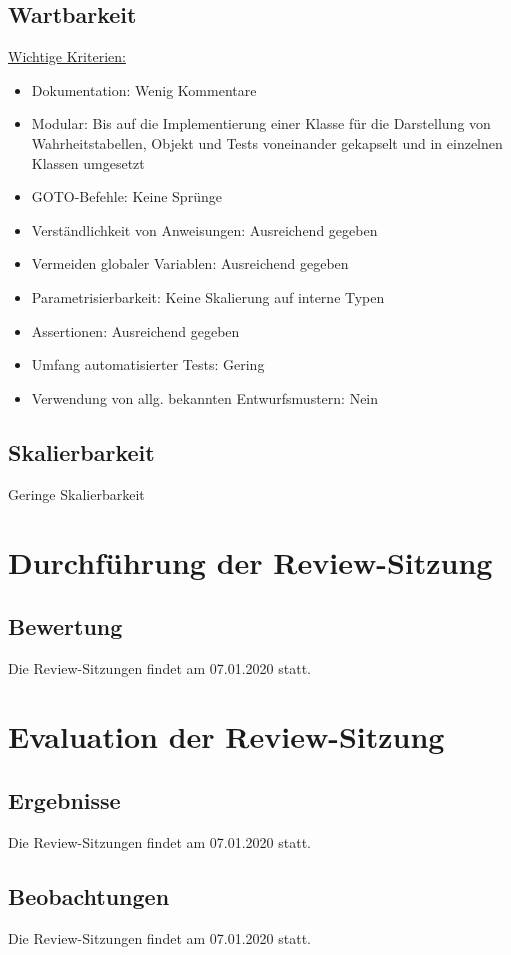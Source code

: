 \documentclass[11pt]{article}
\begin{document}
    \subsection{Wartbarkeit}
    \underline{Wichtige Kriterien:}
    \begin{itemize}
        \item Dokumentation: Wenig Kommentare
        \item Modular: Bis auf die Implementierung einer Klasse f\"ur die Darstellung von Wahrheitstabellen, Objekt und Tests voneinander gekapselt und in einzelnen Klassen umgesetzt
        \item GOTO-Befehle: Keine Spr\"unge
        \item Verst\"andlichkeit von Anweisungen: Ausreichend gegeben
        \item Vermeiden globaler Variablen: Ausreichend gegeben
        \item Parametrisierbarkeit: Keine Skalierung auf interne Typen
        \item Assertionen: Ausreichend gegeben
        \item Umfang automatisierter Tests: Gering
        \item Verwendung von allg. bekannten Entwurfsmustern: Nein
    \end{itemize}


    \subsection{Skalierbarkeit}
    Geringe Skalierbarkeit

    \section{Durchf\"uhrung der Review-Sitzung}
    \subsection{Bewertung}
    Die Review-Sitzungen findet am 07.01.2020 statt.

    \section{Evaluation der Review-Sitzung}
    \subsection{Ergebnisse}
    Die Review-Sitzungen findet am 07.01.2020 statt.
    \subsection{Beobachtungen}
    Die Review-Sitzungen findet am 07.01.2020 statt.
\end{document}
